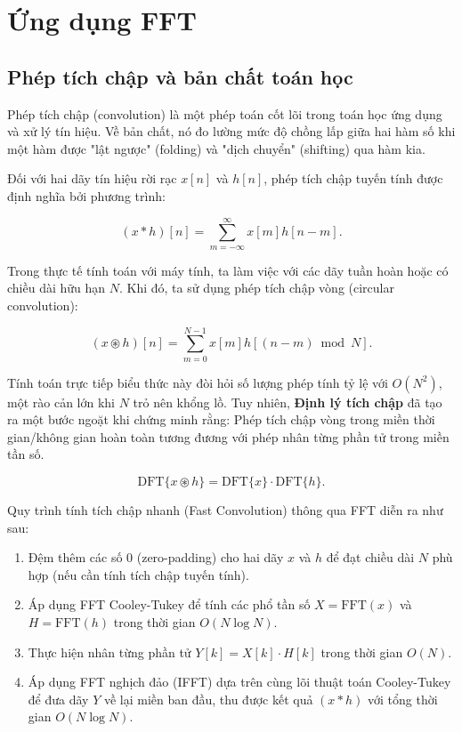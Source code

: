 \section{Ứng dụng FFT}

\subsection{Phép tích chập và bản chất toán học}

Phép tích chập (convolution) là một phép toán cốt lõi trong toán học ứng dụng và xử lý tín hiệu. Về bản chất, nó đo lường mức độ chồng lấp giữa hai hàm số khi một hàm được "lật ngược" (folding) và "dịch chuyển" (shifting) qua hàm kia. 

Đối với hai dãy tín hiệu rời rạc $x[n]$ và $h[n]$, phép tích chập tuyến tính được định nghĩa bởi phương trình:

\begin{equation}
    (x * h)[n] = \sum_{m=-\infty}^{\infty} x[m] h[n - m].
\end{equation}

Trong thực tế tính toán với máy tính, ta làm việc với các dãy tuần hoàn hoặc có chiều dài hữu hạn $N$. Khi đó, ta sử dụng phép tích chập vòng (circular convolution):

\begin{equation}
    (x \circledast h)[n] = \sum_{m=0}^{N-1} x[m] h[(n - m) \bmod N].
\end{equation}

Tính toán trực tiếp biểu thức này đòi hỏi số lượng phép tính tỷ lệ với $O(N^2)$, một rào cản lớn khi $N$ trỏ nên khổng lồ. Tuy nhiên, \textbf{Định lý tích chập} đã tạo ra một bước ngoặt khi chứng minh rằng: Phép tích chập vòng trong miền thời gian/không gian hoàn toàn tương đương với phép nhân từng phần tử trong miền tần số. 

\begin{equation}
    \text{DFT}\{x \circledast h\} = \text{DFT}\{x\} \cdot \text{DFT}\{h\}.
\end{equation}

Quy trình tính tích chập nhanh (Fast Convolution) thông qua FFT diễn ra như sau:
\begin{enumerate}
    \item Đệm thêm các số 0 (zero-padding) cho hai dãy $x$ và $h$ để đạt chiều dài $N$ phù hợp (nếu cần tính tích chập tuyến tính).
    \item Áp dụng FFT Cooley-Tukey để tính các phổ tần số $X = \text{FFT}(x)$ và $H = \text{FFT}(h)$ trong thời gian $O(N \log N)$.
    \item Thực hiện nhân từng phần tử $Y[k] = X[k] \cdot H[k]$ trong thời gian $O(N)$.
    \item Áp dụng FFT nghịch đảo (IFFT) dựa trên cùng lõi thuật toán Cooley-Tukey để đưa dãy $Y$ về lại miền ban đầu, thu được kết quả $(x * h)$ với tổng thời gian $O(N \log N)$.
\end{enumerate}

